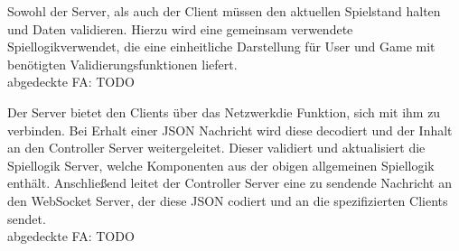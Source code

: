 Sowohl der Server, als auch der Client müssen den aktuellen Spielstand halten und Daten validieren. Hierzu wird eine gemeinsam verwendete \glqq Spiellogik\grqq verwendet, die eine einheitliche Darstellung für User und Game mit benötigten Validierungsfunktionen liefert.\\
abgedeckte FA: TODO\\


Der Server bietet den Clients über das \glqq Netzwerk\grqq die Funktion, sich mit ihm zu verbinden. Bei Erhalt einer JSON Nachricht wird diese decodiert und der Inhalt an den Controller Server weitergeleitet. Dieser validiert und aktualisiert die Spiellogik Server, welche Komponenten aus der obigen allgemeinen Spiellogik enthält. Anschließend leitet der Controller Server eine zu sendende Nachricht an den WebSocket Server, der diese JSON codiert und an die spezifizierten Clients sendet.\\ 
abgedeckte FA: TODO\\

